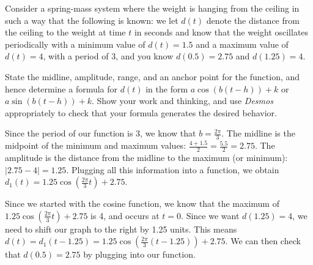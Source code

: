 \documentclass{ximera}
\begin{document}
\begin{example}
Consider a spring-mass system where the weight is hanging from the ceiling in such a way that the following is known: we let \(d(t)\) denote the distance from the ceiling to the weight at time \(t\) in seconds and know that the weight oscillates periodically with a minimum value of \(d(t) = 1.5\) and a maximum value of \(d(t) = 4\), with a period of \(3\), and you know \(d(0.5) = 2.75\) and \(d\left(1.25\right) = 4\).%

State the midline, amplitude, range, and an anchor point for the function, and hence determine a formula for \(d(t)\) in the form \(a\cos(b(t-h))+k\) or \(a\sin(b(t-h))+k\). Show your work and thinking, and use \emph{Desmos} appropriately to check that your formula generates the desired behavior.%
\begin{explanation}
Since the period of our function is 3, we know that $b = \frac{2\pi}{3}$. The midline is the midpoint of the minimum and maximum values: $\frac{4 + 1.5}{2} = \frac{5.5}{2} = 2.75$. The amplitude is the distance from the midline to the maximum (or minimum): $|2.75 - 4| = 1.25$. Plugging all this information into a function, we obtain $d_1(t) = 1.25\cos\left(\frac{2\pi}{3}t\right) + 2.75$. 

Since we started with the cosine function, we know that the maximum of $1.25\cos\left(\frac{2\pi}{3}t\right) + 2.75$ is 4, and occurs at $t = 0$. Since we want $d(1.25) = 4$, we need to shift our graph to the right by 1.25 units. This means $d(t) = d_1(t - 1.25) = 1.25\cos\left(\frac{2\pi}{3}(t - 1.25)\right) + 2.75$. We can then check that $d(0.5) = 2.75$ by plugging into our function. 
\end{explanation}
\end{example}
\end{document}
